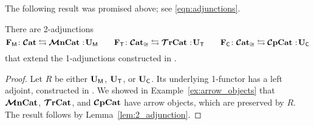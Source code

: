 \documentclass[11pt,oneside,article]{memoir}
\begin{document}
The following result was promised above; see \eqref{eqn:adjunctions}.

\begin{corollary}
      \label{cor:2_adjunctions_MonTrComp}
   There are 2-adjunctions
   \[
      \FM\colon\CCat\leftrightarrows\MMonCat\cocolon\UM
      \qquad
      \FT\colon\CCat_{\iso}\leftrightarrows\TTrCat\cocolon\UT
      \qquad
      \FC\colon\CCat_{\iso}\leftrightarrows\CCompCat\cocolon\UC
   \]
   that extend the 1-adjunctions constructed in \cite{Abramsky2}.
\end{corollary}
\begin{proof}
   Let $R$ be either $\mathbf{U}_{\mathsf{M}}$, $\mathbf{U}_{\mathsf{T}}$, or $\mathbf{U}_{\mathsf{C}}$. Its underlying 1-functor has a left adjoint,
   constructed in \cite{Abramsky2}. We showed in Example~\ref{ex:arrow_objects} that $\bm{\mathcal{M}}\mathbf{nCat}$,
   $\bm{\mathcal{T}}\mathbf{rCat}$, and $\bm{\mathcal{C}}\mathbf{pCat}$ have arrow objects, which are preserved by $R$. The result follows by
   Lemma~\ref{lem:2_adjunction}.
\end{proof}
\end{document}
